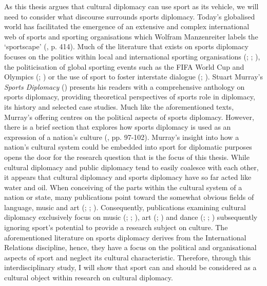 As this thesis argues that cultural diplomacy can use sport as its vehicle, we will need to consider what discourse surrounds sports diplomacy. Today’s globalised world has facilitated the emergence of an extensive and complex international web of sports and sporting organisations which Wolfram Manzenreiter labels the ‘sportscape’ (\citeyear{manzenreiter2008}, p. 414). Much of the literature that exists on sports diplomacy focuses on the politics within local and international sporting organisations (\cite{holt1999}; \cite{tomlinson2016}; \cite{cooley2018}), the politicisation of global sporting events such as the FIFA World Cup and Olympics (\cite{xu2008}; \cite{dowse2018}) or the use of sport to foster interstate dialogue (\cite{rowe2018}; \cite{shuman2018}). Stuart Murray’s \textit{Sports Diplomacy} (\citeyear{murray2018}) presents his readers with a comprehensive anthology on sports diplomacy, providing theoretical perspectives of sports role in diplomacy, its history and selected case studies. Much like the aforementioned texts, Murray’s offering centres on the political aspects of sports diplomacy. However, there is a brief section that explores how sports diplomacy is used as an expression of a nation’s culture (\citeyear{murray2018}, pp. 97-102). Murray’s insight into how a nation’s cultural system could be embedded into sport for diplomatic purposes opens the door for the research question that is the focus of this thesis. While cultural diplomacy and public diplomacy tend to easily coalesce with each other, it appears that cultural diplomacy and sports diplomacy have so far acted like water and oil. When conceiving of the parts within the cultural system of a nation or state, many publications point toward the somewhat obvious fields of language, music and art (\cite{hanna1987}; \cite{blackingetal1995}; \cite{clifford1998}). Consequently, publications examining cultural diplomacy exclusively focus on music (\cite{fosler-lussier2015}; \cite{mikkonensuutari2016}; \cite{saito2020}), art (\cite{barnhisel2015}; \cite{mikkonensuutari2016}) and dance (\cite{prevots1998}; \cite{kodat2014}; \cite{mcdaniel2014}) subsequently ignoring sport’s potential to provide a research subject on culture. The aforementioned literature on sports diplomacy derives from the International Relations discipline, hence, they have a focus on the political and organisational aspects of sport and neglect its cultural characteristic. Therefore, through this interdisciplinary study, I will show that sport can and should be considered as a cultural object within research on cultural diplomacy.

